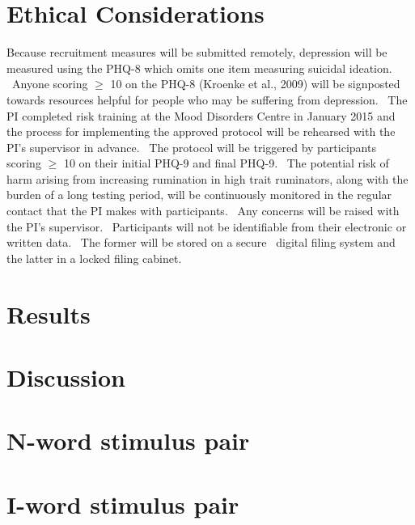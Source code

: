 \documentclass[man,a4paper,biblatex]{apa6}
\begin{document}
\section{Ethical Considerations}
Because recruitment measures will be submitted remotely, depression will
be measured using the PHQ-8 which omits one item measuring suicidal
ideation. \ Anyone scoring ${\geq}$ 10 on the PHQ-8 (Kroenke et al.,
2009) will be signposted towards resources helpful for people who may be
suffering from depression. \ The PI completed risk training at the Mood
Disorders Centre in January 2015 and the process for implementing the
approved protocol will be rehearsed with the PI's supervisor in advance. \
The protocol will be triggered by participants scoring ${\geq}$ 10 on
their initial PHQ-9 and final PHQ-9. \ The potential risk of harm arising
from increasing rumination in high trait ruminators, along with the burden
of a long testing period, will be continuously monitored in the regular
contact that the PI makes with participants. \ Any concerns will be
raised with the PI's supervisor. \ Participants will not be identifiable
from their electronic or written data. \ The former will be stored on a
secure \ digital filing system and the latter in a locked filing cabinet.


\section{Results}

\section{Discussion}

\printbibliography
\appendix
\section{N-word stimulus pair}
\section{I-word stimulus pair}
\end{document}
